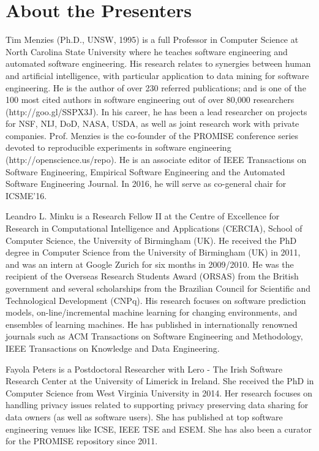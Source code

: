 \documentclass[conference]{IEEEtran}
\begin{document}
\section{About the Presenters}

Tim Menzies (Ph.D., UNSW, 1995) is a full Professor in Computer Science at North Carolina State University where he teaches software engineering and automated software engineering. His research relates to synergies between human and artificial intelligence, with particular application to data mining for software engineering.
He is the author of over 230 referred publications; and is one of the 100 most cited authors in software engineering out of over 80,000 researchers (http://goo.gl/SSPX3J). In his career, he has been a lead researcher on projects for NSF, NIJ, DoD, NASA, USDA, as well as joint research work with private companies.
Prof. Menzies is the co-founder of the PROMISE conference series devoted to reproducible experiments in software engineering (http://openscience.us/repo). He is an associate editor of IEEE Transactions on Software Engineering, Empirical Software Engineering and the Automated Software Engineering Journal. In 2016, he will serve as co-general chair for ICSME'16.


Leandro L. Minku is a Research Fellow II at the Centre of Excellence for Research in Computational Intelligence and Applications (CERCIA), School of Computer Science, the University of Birmingham (UK). He received the PhD degree in Computer Science from the University of Birmingham (UK) in 2011, and was an intern at Google Zurich for six months in 2009/2010. He was the recipient of the Overseas Research Students Award (ORSAS) from the British government and several scholarships from the Brazilian Council for Scientific and Technological Development (CNPq). His research focuses on software prediction models, on-line/incremental machine learning for changing environments, and ensembles of learning machines. He has published in internationally renowned journals such as ACM Transactions on Software Engineering and Methodology, IEEE Transactions on Knowledge and Data Engineering.

Fayola Peters is a Postdoctoral Researcher with Lero - The Irish Software Research Center at the University of Limerick in Ireland. She received the PhD in Computer Science from West Virginia University in 2014. Her research focuses on handling privacy issues related to supporting privacy preserving data sharing for data owners 
(as well as software users). She has published at top software engineering venues like ICSE, IEEE TSE and ESEM. She has also been a curator for the PROMISE repository since 2011.
\end{document}
